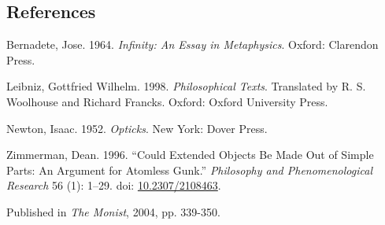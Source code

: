 \documentclass[
  11pt,
  letterpaper,
  DIV=11,
  numbers=noendperiod,
  twoside]{scrartcl}
\newlength{\cslhangindent}
\newenvironment{CSLReferences}[2] %
 {\begin{list}{}{%
  \setlength{\itemindent}{0pt}
  \setlength{\leftmargin}{0pt}
  \setlength{\parsep}{0pt}
  \ifodd #1
   \setlength{\leftmargin}{\cslhangindent}
   \setlength{\itemindent}{-1\cslhangindent}
  \fi
  \setlength{\itemsep}{#2\baselineskip}}}
 {\end{list}}
\begin{document}
\subsection*{References}\label{references}

\label{refs}
\begin{CSLReferences}{1}{0}
Bernadete, Jose. 1964. \emph{Infinity: An Essay in Metaphysics}. Oxford:
Clarendon Press.

Leibniz, Gottfried Wilhelm. 1998. \emph{Philosophical Texts}. Translated
by R. S. Woolhouse and Richard Francks. Oxford: Oxford University Press.

Newton, Isaac. 1952. \emph{Opticks}. New York: Dover Press.

Zimmerman, Dean. 1996. {``Could Extended Objects Be Made Out of Simple
Parts: An Argument for Atomless Gunk.''} \emph{Philosophy and
Phenomenological Research} 56 (1): 1--29. doi:
\href{https://doi.org/10.2307/2108463}{10.2307/2108463}.

\end{CSLReferences}



\noindent Published in\emph{
The Monist}, 2004, pp. 339-350.
\end{document}
